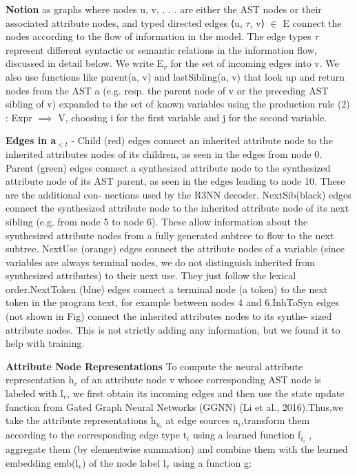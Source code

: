 \documentclass{article}
\begin{document}
\textbf{Notion} as graphs where nodes u, v, . . . are either the AST nodes or their associated attribute nodes, and typed directed edges ⟨u, $\tau$, v⟩ $\in$ E connect the nodes according to the flow of information in the model. The edge types $\tau$ represent different syntactic or semantic relations in the information flow, discussed in detail below. We write E$_v$ for the set of incoming edges into v. We also use functions like parent(a, v) and lastSibling(a, v) that look up and return nodes from the AST a (e.g. resp. the parent node of v or the preceding AST sibling of v) expanded to the set of known variables using the production rule (2) : Expr $\implies$ V, choosing i for the first variable and j for the second variable.

\textbf{Edges in a$_{<t}$} - Child (red) edges connect an inherited attribute node to the inherited attributes nodes of its children, as seen in the edges from node 0. Parent (green) edges connect a synthesized attribute node to the synthesized attribute node of its AST parent, as seen in the edges leading to node 10. These are the additional con- nections used by the R3NN decoder. NextSib(black) edges connect the synthesized attribute node to the inherited attribute node of its next sibling (e.g. from node 5 to node 6). These allow information about the synthesized attribute nodes from a fully generated subtree to flow to the next subtree. NextUse (orange) edges connect the attribute nodes of a variable (since variables are always terminal nodes, we do not distinguish inherited from synthesized attributes) to their next use. They just follow the lexical order.NextToken (blue) edges connect a terminal node (a token) to the next token in the program text, for example between nodes 4 and 6.InhToSyn edges (not shown in Fig) connect the inherited attributes nodes to its synthe- sized attribute nodes. This is not strictly adding any information, but we found it to help with training.

\textbf{Attribute Node Representations} To compute the neural attribute representation h$_v$ of an attribute node v whose corresponding AST node is labeled with l$_v$, we first obtain its incoming edges and then use the state update function from Gated Graph Neural Networks (GGNN) (Li et al., 2016).Thus,we take the attribute representations h$_{u_i}$ at edge sources u$_i$,transform them according to the corresponding edge type t$_i$ using a learned function f$_{t_i}$ , aggregate them (by elementwise summation) and combine them with the learned embedding emb(l$_v$) of the node label l$_v$ using a function g:
\end{document}
